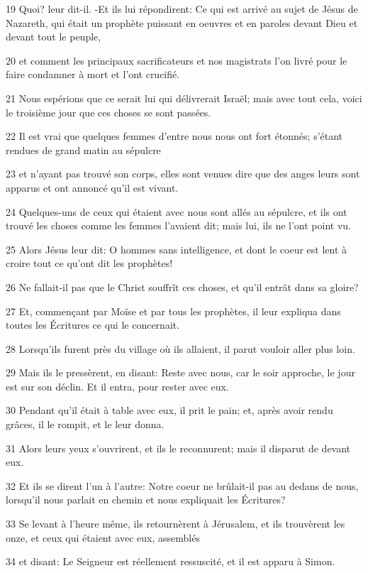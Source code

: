 \par 19 Quoi? leur dit-il. -Et ils lui répondirent: Ce qui est arrivé au sujet de Jésus de Nazareth, qui était un prophète puissant en oeuvres et en paroles devant Dieu et devant tout le peuple,
\par 20 et comment les principaux sacrificateurs et nos magistrats l'on livré pour le faire condamner à mort et l'ont crucifié.
\par 21 Nous espérions que ce serait lui qui délivrerait Israël; mais avec tout cela, voici le troisième jour que ces choses se sont passées.
\par 22 Il est vrai que quelques femmes d'entre nous nous ont fort étonnés; s'étant rendues de grand matin au sépulcre
\par 23 et n'ayant pas trouvé son corps, elles sont venues dire que des anges leurs sont apparus et ont annoncé qu'il est vivant.
\par 24 Quelques-uns de ceux qui étaient avec nous sont allés au sépulcre, et ils ont trouvé les choses comme les femmes l'avaient dit; mais lui, ils ne l'ont point vu.
\par 25 Alors Jésus leur dit: O hommes sans intelligence, et dont le coeur est lent à croire tout ce qu'ont dit les prophètes!
\par 26 Ne fallait-il pas que le Christ souffrît ces choses, et qu'il entrât dans sa gloire?
\par 27 Et, commençant par Moïse et par tous les prophètes, il leur expliqua dans toutes les Écritures ce qui le concernait.
\par 28 Lorsqu'ils furent près du village où ils allaient, il parut vouloir aller plus loin.
\par 29 Mais ils le pressèrent, en disant: Reste avec nous, car le soir approche, le jour est sur son déclin. Et il entra, pour rester avec eux.
\par 30 Pendant qu'il était à table avec eux, il prit le pain; et, après avoir rendu grâces, il le rompit, et le leur donna.
\par 31 Alors leurs yeux s'ouvrirent, et ils le reconnurent; mais il disparut de devant eux.
\par 32 Et ils se dirent l'un à l'autre: Notre coeur ne brûlait-il pas au dedans de nous, lorsqu'il nous parlait en chemin et nous expliquait les Écritures?
\par 33 Se levant à l'heure même, ils retournèrent à Jérusalem, et ils trouvèrent les onze, et ceux qui étaient avec eux, assemblés
\par 34 et disant: Le Seigneur est réellement ressuscité, et il est apparu à Simon.
